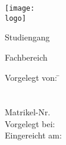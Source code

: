 \begin{titlepage}

\begin{minipage}{\textwidth}
		\noindent \hfill \texttt{[image: \\logo]}
\end{minipage}
\vspace{6em}

\begin{center}
    {\huge \art}
    
    {\Large Studiengang \studiengang}
    
    \vspace{4em}
    
    \textbf{{\Large \titel}}
    
    \vspace{4em}
    
    \hochschule
    
    \hochschulezusatz

    Fachbereich \fachbereich
    
    \vspace{6em}

	\begin{minipage}{\textwidth}
		\begin{tabbing}
		
		Vorgelegt von:  \hspace*{2em}\= \autor \\
		\> \strasseAutor \\
        \> \stadtAutor \\
        \> Matrikel-Nr. \matrikelnr \\
        Vorgelegt bei: \> \betreuer \\
        Eingereicht am: \> \datumAbgabe
		\end{tabbing}

	\end{minipage}
\end{center}
\end{titlepage}
